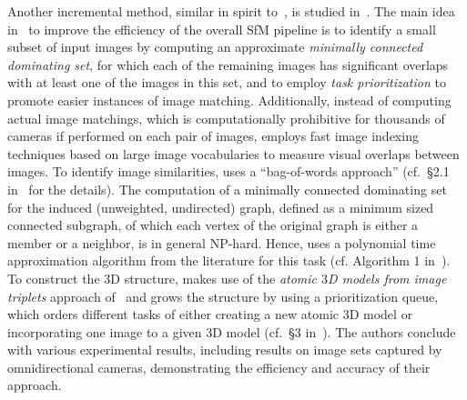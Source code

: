 \documentclass[10pt]{article}
\begin{document}
Another incremental method, similar in spirit to~\cite{SnavelySkeletal}, is studied in~\cite{HavlenaGraphOptim}. The main idea in~\cite{HavlenaGraphOptim} to improve the efficiency of the overall SfM pipeline is to identify a small subset of input images by computing an approximate \textit{minimally connected dominating set}, for which each of the remaining images has significant overlaps with at least one of the images in this set, and to employ \textit{task prioritization} to promote easier instances of image matching. Additionally, instead of computing actual image matchings, which is computationally prohibitive for thousands of cameras if performed on each pair of images, \cite{HavlenaGraphOptim} employs fast image indexing techniques based on large image vocabularies to measure visual overlaps between images. To identify image similarities, \cite{HavlenaGraphOptim} uses a ``bag-of-words approach'' (cf.~\S2.1 in~\cite{HavlenaGraphOptim} for the details). The computation of a minimally connected dominating set for the induced (unweighted, undirected) graph, defined as a minimum sized connected subgraph, of which each vertex of the original graph is either a member or a neighbor, is in general NP-hard. Hence, \cite{HavlenaGraphOptim} uses a polynomial time approximation algorithm from the literature for this task (cf. Algorithm 1 in~\cite{HavlenaGraphOptim}). To construct the $3$D structure, \cite{HavlenaGraphOptim} makes use of the \textit{atomic $3$D models from image triplets} approach of~\cite{HavlenaGroups} and grows the structure by using a prioritization queue, which orders different tasks of either creating a new atomic $3$D model or incorporating one image to a given $3$D model (cf.~\S3 in~\cite{HavlenaGraphOptim}). The authors conclude with various experimental results, including results on image sets captured by omnidirectional cameras, demonstrating the efficiency and accuracy of their approach.
\end{document}
